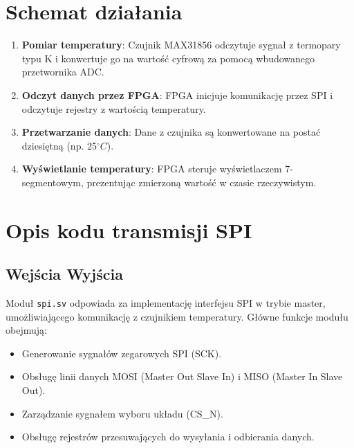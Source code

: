 \documentclass[a4paper,12pt]{article}
\begin{document}
\section{Schemat działania}
\begin{enumerate}
    \item \textbf{Pomiar temperatury}: Czujnik MAX31856 odczytuje sygnał z termopary typu K i konwertuje go na wartość cyfrową za pomocą wbudowanego przetwornika ADC.
    \item \textbf{Odczyt danych przez FPGA}: FPGA inicjuje komunikację przez SPI i odczytuje rejestry z wartością temperatury.
    \item \textbf{Przetwarzanie danych}: Dane z czujnika są konwertowane na postać dziesiętną (np. 25\(^\circ C\)).
    \item \textbf{Wyświetlanie temperatury}: FPGA steruje wyświetlaczem 7-segmentowym, prezentując zmierzoną wartość w czasie rzeczywistym.
\end{enumerate}

\section{Opis kodu transmisji SPI}

\subsection*{Wejścia Wyjścia}
Moduł \texttt{spi.sv} odpowiada za implementację interfejsu SPI w trybie master, umożliwiającego komunikację z czujnikiem temperatury. Główne funkcje modułu obejmują:

\begin{itemize}
    \item Generowanie sygnałów zegarowych SPI (SCK).
    \item Obsługę linii danych MOSI (Master Out Slave In) i MISO (Master In Slave Out).
    \item Zarządzanie sygnałem wyboru układu (CS\_N).
    \item Obsługę rejestrów przesuwających do wysyłania i odbierania danych.
\end{itemize}
\end{document}
